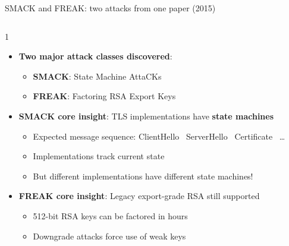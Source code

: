 \ifdefined\PRESENTATION\else\PassOptionsToClass{handout}{beamer}\fi\documentclass[aspectratio=169, lualatex]{beamer}
\begin{document}
\begin{frame}{SMACK and FREAK: two attacks from one paper (2015)}
	\begin{columns}[c]
		\begin{column}{1\textwidth}
			\begin{itemize}[<+->]
				\item \textbf{Two major attack classes discovered}:
				      \begin{itemize}
					      \item \textbf{SMACK}: State Machine AttaCKs
					      \item \textbf{FREAK}: Factoring RSA Export Keys
				      \end{itemize}
				\item \textbf{SMACK core insight}: TLS implementations have \textbf{state machines}
				      \begin{itemize}
					      \item Expected message sequence: ClientHello \rightarrow\ ServerHello \rightarrow\ Certificate \rightarrow\ \ldots
					      \item Implementations track current state
					      \item But different implementations have different state machines!
				      \end{itemize}
				\item \textbf{FREAK core insight}: Legacy export-grade RSA still supported
				      \begin{itemize}
					      \item 512-bit RSA keys can be factored in hours
					      \item Downgrade attacks force use of weak keys
				      \end{itemize}
			\end{itemize}
		\end{column}
	\end{columns}
\end{frame}
\end{document}
